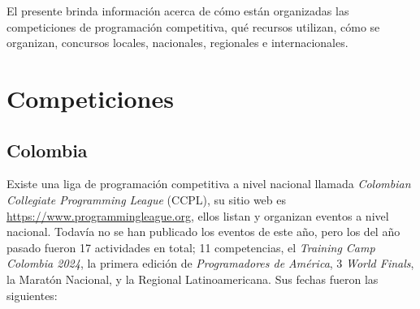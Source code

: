 \documentclass[12pt]{article}
\begin{document}

El presente brinda información acerca de cómo están organizadas las competiciones de programación competitiva, qué recursos utilizan, cómo se organizan, concursos locales, nacionales, regionales e internacionales.


\tableofcontents



\section{Competiciones}

\subsection{Colombia}

Existe una liga de programación competitiva a nivel nacional llamada \textit{Colombian Collegiate Programming League} (CCPL), su sitio web es \url{https://www.programmingleague.org}, ellos listan y organizan eventos a nivel nacional. Todavía no se han publicado los eventos de este año, pero los del año pasado fueron 17 actividades en total; 11 competencias, el \textit{Training Camp Colombia 2024}, la primera edición de \textit{Programadores de América}, 3 \textit{World Finals}, la Maratón Nacional, y la Regional Latinoamericana.\cite{ccpl} Sus fechas fueron las siguientes:
\end{document}
